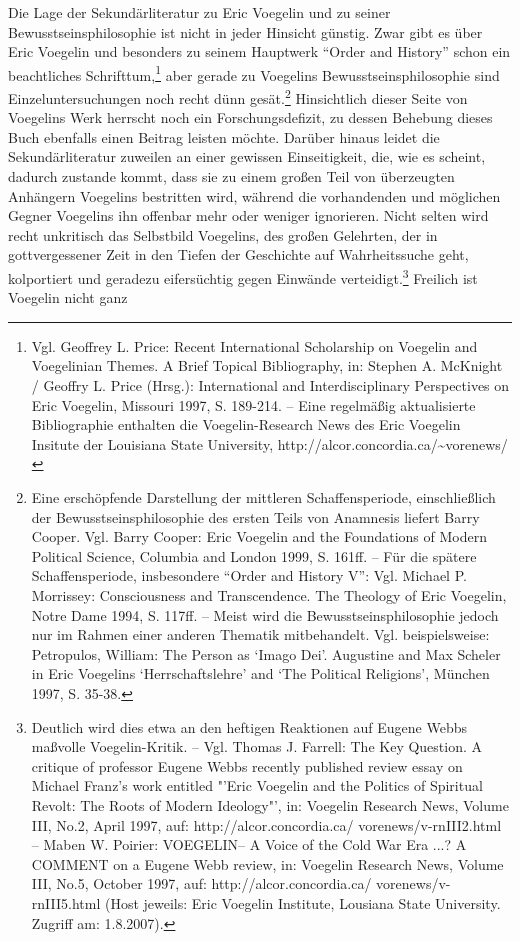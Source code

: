Die Lage der Sekundärliteratur zu Eric Voegelin und zu seiner
Bewusstseinsphilosophie ist nicht in jeder Hinsicht günstig. Zwar gibt es über
Eric Voegelin und besonders zu seinem Hauptwerk "`Order and History"' schon
ein beachtliches Schrifttum,\footnote{Vgl. Geoffrey L. Price: Recent
  International Scholarship on Voegelin and Voegelinian Themes. A Brief
  Topical Bibliography, in: Stephen A. McKnight / Geoffry L. Price (Hrsg.):
  International and Interdisciplinary Perspectives on Eric Voegelin, Missouri
  1997, S. 189-214. -- Eine regelmäßig aktualisierte Bibliographie enthalten
  die Voegelin-Research News des Eric Voegelin Insitute der Louisiana State
  University, http://alcor.concordia.ca/\~{ }vorenews/} aber gerade zu
Voegelins Bewusstseinsphilosophie sind Einzeluntersuchungen noch recht dünn
gesät.\footnote{Eine erschöpfende Darstellung der mittleren Schaffensperiode,
  einschließlich der Bewusstseinsphilosophie des ersten Teils von Anamnesis
  liefert Barry Cooper. Vgl. Barry Cooper: Eric Voegelin and the Foundations
  of Modern Political Science, Columbia and London 1999, S. 161ff. -- Für die
  spätere Schaffensperiode, insbesondere "`Order and History V"': Vgl. Michael
  P. Morrissey: Consciousness and Transcendence. The Theology of Eric
  Voegelin, Notre Dame 1994, S. 117ff. -- Meist wird die
  Bewusstseinsphilosophie jedoch nur im Rahmen einer anderen Thematik
  mitbehandelt. Vgl.  beispielsweise: Petropulos, William: The Person as
  `Imago Dei'. Augustine and Max Scheler in Eric Voegelins `Herrschaftslehre'
  and `The Political Religions', München 1997, S. 35-38.} Hinsichtlich dieser
Seite von Voegelins Werk herrscht noch ein Forschungsdefizit, zu dessen
Behebung dieses Buch ebenfalls einen Beitrag leisten möchte. Darüber hinaus
leidet die Sekundärliteratur zuweilen an einer gewissen Einseitigkeit, die,
wie es scheint, dadurch zustande kommt, dass sie zu einem großen Teil von
überzeugten Anhängern Voegelins bestritten wird, während die vorhandenden und
möglichen Gegner Voegelins ihn offenbar mehr oder weniger ignorieren. Nicht
selten wird recht unkritisch das Selbstbild Voegelins, des großen Gelehrten,
der in gottvergessener Zeit in den Tiefen der Geschichte auf Wahrheitssuche
geht, kolportiert und geradezu eifersüchtig gegen Einwände
verteidigt.\footnote{Deutlich wird dies etwa an den heftigen Reaktionen auf
  Eugene Webbs maßvolle Voegelin-Kritik.  -- Vgl. Thomas J.  Farrell: The Key
  Question. A critique of professor Eugene Webbs recently published review
  essay on Michael Franz's work entitled "'Eric Voegelin and the Politics of
  Spiritual Revolt: The Roots of Modern Ideology"', in: Voegelin Research
  News, Volume III, No.2, April 1997, auf: http://alcor.concordia.ca/\~{
  }vorenews/v-rnIII2.html -- Maben W. Poirier: VOEGELIN-- A Voice of the Cold
  War Era ...? A COMMENT on a Eugene Webb review, in: Voegelin Research News,
  Volume III, No.5, October 1997, auf: http://alcor.concordia.ca/\~{
  }vorenews/v-rnIII5.html (Host jeweils: Eric Voegelin Institute, Lousiana
  State University. Zugriff am: 1.8.2007).}  Freilich ist Voegelin nicht ganz
